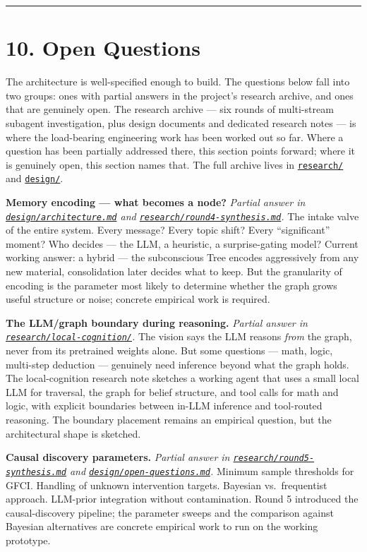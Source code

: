 \documentclass[12pt]{article}
\begin{document}
\begin{center}\rule{0.5\linewidth}{0.5pt}\end{center}

\section{10. Open Questions}\label{open-questions}

The architecture is well-specified enough to build. The questions below fall into two groups: ones with partial answers in the project's research archive, and ones that are genuinely open. The research archive --- six rounds of multi-stream subagent investigation, plus design documents and dedicated research notes --- is where the load-bearing engineering work has been worked out so far. Where a question has been partially addressed there, this section points forward; where it is genuinely open, this section names that. The full archive lives in \href{../research/}{\texttt{research/}} and \href{../design/}{\texttt{design/}}.

\textbf{Memory encoding --- what becomes a node?} \emph{Partial answer in \href{../design/architecture.md}{\texttt{design/architecture.md}} and \href{../research/round4-synthesis.md}{\texttt{research/round4-synthesis.md}}.} The intake valve of the entire system. Every message? Every topic shift? Every ``significant'' moment? Who decides --- the LLM, a heuristic, a surprise-gating model? Current working answer: a hybrid --- the subconscious Tree encodes aggressively from any new material, consolidation later decides what to keep. But the granularity of encoding is the parameter most likely to determine whether the graph grows useful structure or noise; concrete empirical work is required.

\textbf{The LLM/graph boundary during reasoning.} \emph{Partial answer in \href{../research/local-cognition/}{\texttt{research/local-cognition/}}.} The vision says the LLM reasons \emph{from} the graph, never from its pretrained weights alone. But some questions --- math, logic, multi-step deduction --- genuinely need inference beyond what the graph holds. The local-cognition research note sketches a working agent that uses a small local LLM for traversal, the graph for belief structure, and tool calls for math and logic, with explicit boundaries between in-LLM inference and tool-routed reasoning. The boundary placement remains an empirical question, but the architectural shape is sketched.

\textbf{Causal discovery parameters.} \emph{Partial answer in \href{../research/round5-synthesis.md}{\texttt{research/round5-synthesis.md}} and \href{../design/open-questions.md}{\texttt{design/open-questions.md}}.} Minimum sample thresholds for GFCI. Handling of unknown intervention targets. Bayesian vs.~frequentist approach. LLM-prior integration without contamination. Round 5 introduced the causal-discovery pipeline; the parameter sweeps and the comparison against Bayesian alternatives are concrete empirical work to run on the working prototype.
\end{document}
